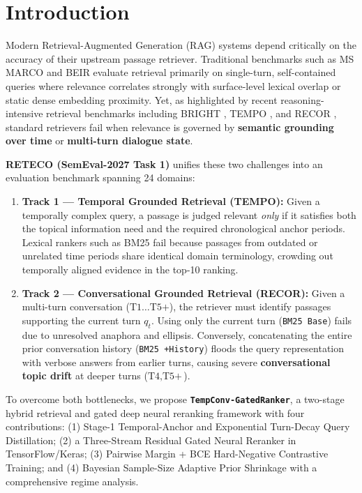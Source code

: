 \documentclass[10pt,twocolumn]{article}
\begin{document}
\section{Introduction}
Modern Retrieval-Augmented Generation (RAG) systems depend critically on the accuracy of their upstream passage retriever. Traditional benchmarks such as MS MARCO and BEIR \cite{thakur2021beir} evaluate retrieval primarily on single-turn, self-contained queries where relevance correlates strongly with surface-level lexical overlap or static dense embedding proximity. Yet, as highlighted by recent reasoning-intensive retrieval benchmarks including BRIGHT \cite{su2024bright}, TEMPO \cite{abdallah2026tempo}, and RECOR \cite{ali2026recor}, standard retrievers fail when relevance is governed by \textbf{semantic grounding over time} or \textbf{multi-turn dialogue state}.

\textbf{RETECO (SemEval-2027 Task 1)} \cite{abdallah2026reteco} unifies these two challenges into an evaluation benchmark spanning 24 domains:
\begin{enumerate}
    \item \textbf{Track 1 --- Temporal Grounded Retrieval (TEMPO):} Given a temporally complex query, a passage is judged relevant \emph{only} if it satisfies both the topical information need and the required chronological anchor periods. Lexical rankers such as BM25 fail because passages from outdated or unrelated time periods share identical domain terminology, crowding out temporally aligned evidence in the top-10 ranking.
    \item \textbf{Track 2 --- Conversational Grounded Retrieval (RECOR):} Given a multi-turn conversation ($\text{T1}\dots\text{T5+}$), the retriever must identify passages supporting the current turn $q_t$. Using only the current turn (\texttt{BM25 Base}) fails due to unresolved anaphora and ellipsis. Conversely, concatenating the entire prior conversation history (\texttt{BM25 +History}) floods the query representation with verbose answers from earlier turns, causing severe \textbf{conversational topic drift} at deeper turns ($\text{T4}, \text{T5+}$).
\end{enumerate}

To overcome both bottlenecks, we propose \textbf{\texttt{TempConv-GatedRanker}}, a two-stage hybrid retrieval and gated deep neural reranking framework with four contributions: (1) Stage-1 Temporal-Anchor and Exponential Turn-Decay Query Distillation; (2) a Three-Stream Residual Gated Neural Reranker in TensorFlow/Keras; (3) Pairwise Margin + BCE Hard-Negative Contrastive Training; and (4) Bayesian Sample-Size Adaptive Prior Shrinkage with a comprehensive regime analysis.
\end{document}
